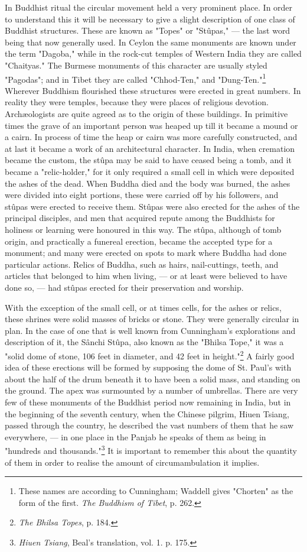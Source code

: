 \documentclass[a4paper, 11pt, oneside, polutonikogreek, english]{article}
\begin{document}
In Buddhist ritual the circular movement held a very prominent place. In order to understand this it will be necessary to give a slight description of one class of Buddhist structures. These are known as "Topes" or "Stûpas," --- the last word being that now generally used. In Ceylon the same monuments are known under the term "Dagoba," while in the rock-cut temples of Western India they are called "Chaityas." The Burmese monuments of this character are usually styled "Pagodas"; and in Tibet they are called "Chhod-Ten," and "Dung-Ten."\footnote{These names are according to Cunningham; Waddell gives "Chorten" as the form of the first. \emph{The Buddhism of Tibet}, p. 262.} Wherever Buddhism flourished these structures were erected in great numbers. In reality they were temples, because they were places of religious devotion. Archæologists are quite agreed as to the origin of these buildings. In primitive times the grave of an important person was heaped up till it became a mound or a cairn. In process of time the heap or cairn was more carefully constructed, and at last it became a work of an architectural character. In India, when cremation became the custom, the stûpa may be said to have ceased being a tomb, and it became a "relic-holder," for it only required a small cell in which were deposited the ashes of the dead. When Buddha died and the body was burned, the ashes were divided into eight portions, these were carried off by his followers, and stûpas were erected to receive them. Stûpas were also erected for the ashes of the principal disciples, and men that acquired repute among the Buddhists for holiness or learning were honoured in this way. The stûpa, although of tomb origin, and practically a funereal erection, became the accepted type for a monument; and many were erected on spots to mark where Buddha had done particular actions. Relics of Buddha, such as hairs, nail-cuttings, teeth, and articles that belonged to him when living, --- or at least were believed to have done so, --- had stûpas erected for their preservation and worship.

With the exception of the small cell, or at times cells, for the ashes or relics, these shrines were solid masses of bricks or stone. They were generally circular in plan. In the case of one that is well known from Cunningham's explorations and description of it, the Sânchi Stûpa, also known as the "Bhilsa Tope," it was a "solid dome of stone, 106 feet in diameter, and 42 feet in height."\footnote{\emph{The Bhilsa Topes}, p. 184.} A fairly good idea of these erections will be formed by supposing the dome of St. Paul's with about the half of the drum beneath it to have been a solid mass, and standing on the ground. The apex was surmounted by a number of umbrellas. There are very few of these monuments of the Buddhist period now remaining in India, but in the beginning of the seventh century, when the Chinese pilgrim, Hiuen Tsiang, passed through the country, he described the vast numbers of them that he saw everywhere, --- in one place in the Panjab he speaks of them as being in "hundreds and thousands."\footnote{\emph{Hiuen Tsiang}, Beal's translation, vol. 1. p. 175.} It is important to remember this about the quantity of them in order to realise the amount of circumambulation it implies.
\end{document}
